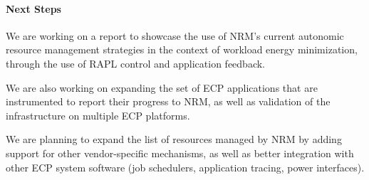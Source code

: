 \paragraph{Next Steps}

We are working on a report to showcase the use of NRM's current autonomic
resource management strategies in the context of workload energy minimization,
through the use of RAPL control and application feedback.

We are also working on expanding the set of ECP applications that are
instrumented to report their progress to NRM, as well as validation of the
infrastructure on multiple ECP platforms.

We are planning to expand the list of resources managed by NRM by
adding support for other vendor-specific mechanisms, as well as better
integration with other ECP system software (job schedulers, application
tracing, power interfaces).
